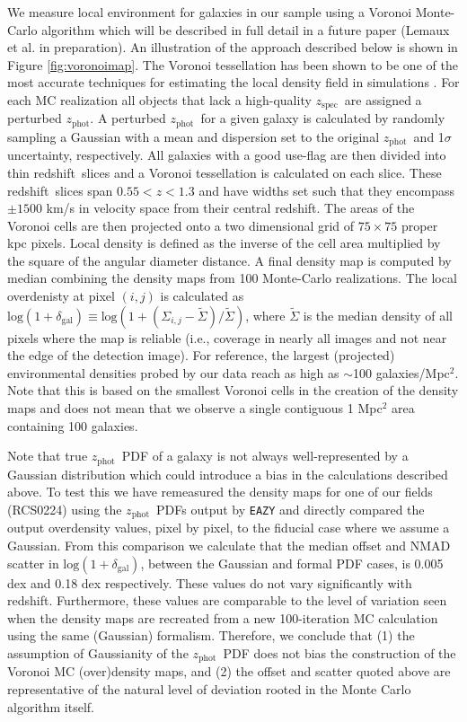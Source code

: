 \documentclass[a4paper,fleqn,usenatbib]{mnras}
\def\z{redshift}
\def\zphot{$z_{\mathrm{phot}}$}
\def\zspec{$z_{\mathrm{spec}}$}
\begin{document}
We measure local environment for galaxies in our sample using a Voronoi Monte-Carlo algorithm which will be described in full detail in a future paper (Lemaux et al. in preparation).
An illustration of the approach described below is shown in Figure \ref{fig:voronoimap}.
The Voronoi tessellation has been shown to be one of the most accurate techniques for estimating the local density field in simulations \citep{Darvish2015}.
For each MC realization all objects that lack a high-quality \zspec\ are assigned a perturbed \zphot .
A perturbed \zphot\ for a given galaxy is calculated by randomly sampling a Gaussian with a mean and dispersion set to the original \zphot\ and 1$\sigma$  uncertainty, respectively.
All galaxies with a good use-flag are then divided into thin \z\ slices and a Voronoi tessellation is calculated on each slice.
These \z\ slices span $0.55 < z < 1.3$ and have widths set such that they encompass $\pm 1500$ km/s in velocity space from their central \z .
The areas of the Voronoi cells are then projected onto a two dimensional grid of $75 \times 75$ proper kpc pixels.
Local density is defined as the inverse of the cell area multiplied by the square of the angular diameter distance.
A final density map is computed by median combining the density maps from 100 Monte-Carlo realizations.
The local overdenisty at pixel $(i, j)$ is calculated as $\mathrm{log}(1 + \delta_{\mathrm{gal}}) \equiv \mathrm{log}(1 + (\Sigma_{i, j} - \tilde{\Sigma}) / \tilde{\Sigma})$, where $\tilde{\Sigma}$ is the median density of all pixels where the map is reliable (i.e., coverage in nearly all images and not near the edge of the detection image).
For reference, the largest (projected) environmental densities probed by our data reach as high as $\sim$100 galaxies/Mpc$^2$.
Note that this is based on the smallest Voronoi cells in the creation of the density maps and does not mean that we observe a single contiguous 1 Mpc$^2$ area containing 100 galaxies.


Note that true \zphot\ PDF of a galaxy is not always well-represented by a Gaussian distribution which could introduce a bias in the calculations described above.
To test this we have remeasured the density maps for one of our fields (RCS0224) using the \zphot\ PDFs output by {\tt EAZY} and directly compared the output overdensity values, pixel by pixel, to the fiducial case where we assume a Gaussian.
From this comparison we calculate that the median offset and NMAD scatter in $\mathrm{log}(1 + \delta_{\mathrm{gal}})$, between the Gaussian and formal PDF cases, is 0.005 dex and 0.18 dex respectively.
These values do not vary significantly with redshift.
Furthermore, these values are comparable to the level of variation seen when the density maps are recreated from a new 100-iteration MC calculation using the same (Gaussian) formalism.
Therefore, we conclude that (1) the assumption of Gaussianity of the \zphot\ PDF does not bias the construction of the Voronoi MC (over)density maps, and (2) the offset and scatter quoted above are representative of the natural level of deviation rooted in the Monte Carlo algorithm itself.
\end{document}

